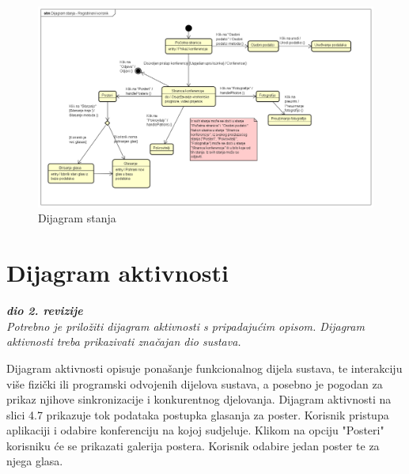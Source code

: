 			\begin{figure} [hbt!]
				\includegraphics[width=\linewidth]{Slike/StateMachineDiagram}
				\caption{Dijagram stanja}
			\end{figure}
			
			
			\eject 
		
		\section{Dijagram aktivnosti}
			
			\textbf{\textit{dio 2. revizije}}\\
			
			 \textit{Potrebno je priložiti dijagram aktivnosti s pripadajućim opisom. Dijagram aktivnosti treba prikazivati značajan dio sustava.}
			 
			 \indent Dijagram aktivnosti opisuje ponašanje funkcionalnog dijela sustava, te interakciju više fizički ili programski odvojenih dijelova sustava, a posebno je pogodan za prikaz njihove sinkronizacije i konkurentnog djelovanja. Dijagram aktivnosti na slici 4.7 prikazuje tok podataka postupka glasanja za poster. Korisnik pristupa aplikaciji i odabire konferenciju na kojoj sudjeluje. Klikom na opciju "Posteri" korisniku će se prikazati galerija postera. Korisnik odabire jedan poster te za njega glasa.    
			 
